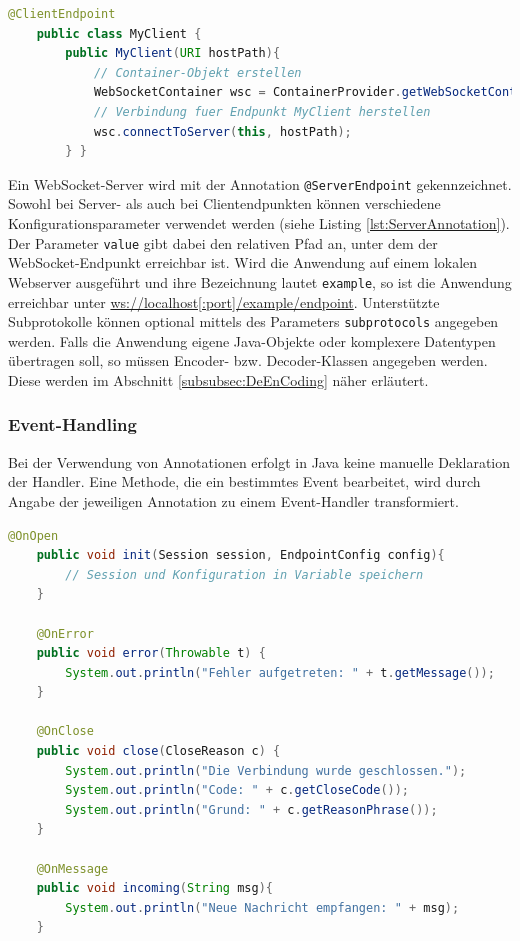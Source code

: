 \documentclass[11pt,a4paper,titlepage]{scrartcl}
\numberwithin{equation}{section}
\begin{document}
\begin{lstlisting}[frame=single, language=Java, caption=Java Client: Verbindungsaufbau]
	@ClientEndpoint
	public class MyClient {
		public MyClient(URI hostPath){
			// Container-Objekt erstellen
			WebSocketContainer wsc = ContainerProvider.getWebSocketContainer();
			// Verbindung fuer Endpunkt MyClient herstellen
			wsc.connectToServer(this, hostPath);
		} }
\end{lstlisting}

\noindent Ein WebSocket-Server wird mit der Annotation \texttt{@ServerEndpoint} gekennzeichnet. Sowohl bei Server- als auch bei Clientendpunkten können verschiedene Konfigurationsparameter verwendet werden (siehe Listing \ref{lst:ServerAnnotation}). Der Parameter \texttt{value} gibt dabei den relativen Pfad an, unter dem der WebSocket-Endpunkt erreichbar ist. Wird die Anwendung auf einem lokalen Webserver ausgeführt und ihre Bezeichnung lautet \texttt{example}, so ist die Anwendung erreichbar unter \url{ws://localhost[:port]/example/endpoint}. Unterstützte Subprotokolle können optional mittels des Parameters \texttt{subprotocols} angegeben werden. Falls die Anwendung eigene Java-Objekte oder komplexere Datentypen übertragen soll, so müssen Encoder- bzw. Decoder-Klassen angegeben werden. Diese werden im Abschnitt \ref{subsubsec:DeEnCoding} näher erläutert.

\subsubsection*{Event-Handling}
\noindent Bei der Verwendung von Annotationen erfolgt in Java keine manuelle Deklaration der Handler. Eine Methode, die ein bestimmtes Event bearbeitet, wird durch Angabe der jeweiligen Annotation zu einem Event-Handler transformiert.\\
\begin{lstlisting}[frame=single, language=Java, caption=Java: Event-Handler]
	@OnOpen
	public void init(Session session, EndpointConfig config){
		// Session und Konfiguration in Variable speichern
	}
	
	@OnError
	public void error(Throwable t) {
		System.out.println("Fehler aufgetreten: " + t.getMessage());
	}
	
	@OnClose
	public void close(CloseReason c) {
		System.out.println("Die Verbindung wurde geschlossen.");
		System.out.println("Code: " + c.getCloseCode());
		System.out.println("Grund: " + c.getReasonPhrase()); 
	}
	
	@OnMessage
	public void incoming(String msg){
		System.out.println("Neue Nachricht empfangen: " + msg);
	}
	
\end{lstlisting}
\end{document}

